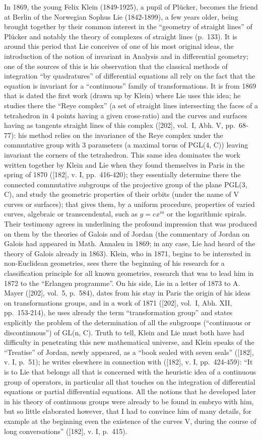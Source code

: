 In 1869, the young Felix Klein (1849-1925), a pupil of Plücker, becomes the friend at Berlin of the Norwegian Sophus Lie (1842-1899), a few years older, being brought together by their common interest in the ``geometry of straight lines'' of Plücker and notably the theory of complexes of straight lines (p.~133). It is around this period that Lie conceives of one of his most original ideas, the introduction of the notion of invariant in Analysis and in differential geometry; one of the sources of this is his observation that the classical methods of integration ``by quadratures'' of differential equations all rely on the fact that the equation is invariant for a ``continuous'' family of transformations. It is from 1869 that is dated the first work (drawn up by Klein) where Lie uses this idea; he studies there the ``Reye complex'' (a set of straight lines intersecting the faces of a tetrahedron in 4 points having a given cross-ratio) and the curves and surfaces having as tangents straight lines of this complex ({[}202{]}, vol.~I, Abh. V, pp.~68-77): his method relies on the invariance of the Reye complex under the commutative group with 3 parameters (a maximal torus of PGL(4, C)) leaving invariant the corners of the tetrahedron. This same idea dominates the work written together by Klein and Lie when they found themselves in Paris in the spring of 1870 ({[}182{]}, v. I, pp.~416-420); they essentially determine there the connected commutative subgroups of the projective group of the plane PGL(3, C), and study the geometric properties of their orbits (under the name of V curves or surfaces); that gives them, by a uniform procedure, properties of varied curves, algebraic or transcendental, such as \(y = cx^m\) or the logarithmic spirals. Their testimony agrees in underlining the profound impression that was produced on them by the theories of Galois and of Jordan (the commentary of Jordan on Galois had appeared in Math. Annalen in 1869; in any case, Lie had heard of the theory of Galois already in 1863). Klein, who in 1871, begins to be interested in non-Euclidean geometries, sees there the beginning of his research for a classification principle for all known geometries, research that was to lead him in 1872 to the ``Erlangen programme''. On his side, Lie in a letter of 1873 to A. Mayer ({[}202{]}, vol.~5, p.~584), dates from his stay in Paris the origin of his ideas on transformations groups, and in a work of 1871 ({[}202{]}, vol.~I, Abh. XII, pp.~153-214), he uses already the term ``transformation group'' and states explicitly the problem of the determination of all the subgroups (``continuous or discontinuous'') of GL(n, C). Truth to tell, Klein and Lie must both have had difficulty in penetrating this new mathematical universe, and Klein speaks of the ``Treatise'' of Jordan, newly appeared, as a ``book sealed with seven seals'' ({[}182{]}, v. I, p.~51); he writes elsewhere in connection with ({[}182{]}, v. I, pp.~424-459): ``It is to Lie that belongs all that is concerned with the heuristic idea of a continuous group of operators, in particular all that touches on the integration of differential equations or partial differential equations. All the notions that he developed later in his theory of continuous groups were already to be found in embryo with him, but so little elaborated however, that I had to convince him of many details, for example at the beginning even the existence of the curves V, during the course of long conversations'' ({[}182{]}, v. I, p.~415).

